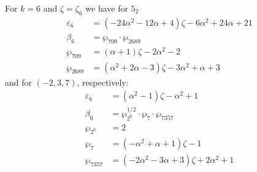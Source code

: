 \documentclass[12pt]{amsart}
\theoremstyle{definition}
\def\a{\alpha}
\def\z{\zeta}
\def\z{\zeta}
\begin{document}
\noindent 
For $k=6$ and $\zeta=\zeta_6$ we have for $5_2$
{\small
\begin{align*}
\varepsilon_{6} &= 
(-24 \a^2 - 12 \a + 4) \z - 6 \a^2 + 24 \a + 21
\\
\beta_{6} &= \wp_{709} \cdot \wp_{2689} \\
\wp_{709} &= (\a + 1) \z - 2 \a^2 - 2
\\
\wp_{2689} &= (\a^2 + 2 \a - 3) \z - 3 \a^2 + \a + 3
\end{align*}
}
and for $(-2,3,7)$, respectively:
{\small
\begin{align*}
\varepsilon_{6} &= 
(\a^2 - 1) \z - \a^2 + 1
\\
\beta_{6} &= \wp_{2^6}^{1/2} \cdot \wp_{7} \cdot \wp_{7357} \\
\wp_{2^6} &= 2
\\
\wp_{7} &= (-\a^2 + \a + 1) \z - 1
\\
\wp_{7357} &= (-2 \a^2 - 3 \a + 3) \z + 2 \a^2 + 1
\end{align*}
}
\end{document}
